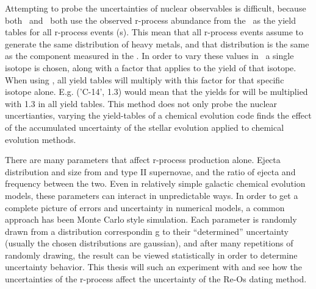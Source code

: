 
Attempting to probe the uncertainties of nuclear observables is difficult, because both \eris\ and \omegamodel\ both use the observed r-process abundance from the \sos\ as the yield tables for all r-process events (\nsm\-s). This mean that all r-process events assume to generate the same distribution of heavy metals, and that distribution is the same as the component measured in the \sos.
In order to vary these values in \omegamodel\ a single isotope is chosen, along with a factor that applies to the yield of that isotope. When using \omegamodel, all yield tables will multiply with this factor for that specific isotope alone. E.g. ('C-14', 1.3) would mean that the yields for  will be multiplied with 1.3 in all yield tables.
This method does not only probe the nuclear uncertianties, varying the yield-tables of a chemical evolution code finds the effect of the accumulated uncertainty of the stellar evolution applied to chemical evolution methods.

There are many parameters that affect r-process production alone. Ejecta distribution and size from \nsm and type II supernovae, and the ratio of ejecta and frequency between the two. Even in relatively simple galactic chemical evolution models, these parameters can interact in unpredictable ways. In order to get a complete picture of errors and uncertainty in numerical models, a common approach has been Monte Carlo style simulation. Each parameter is randomly drawn from a distribution correspondin g to their ``determined'' uncertainty (usually the chosen distributions are gaussian), and after many repetitions of randomly drawing, the result can be viewed statistically in order to determine uncertainty behavior.
This thesis will such an experiment with  and see how the uncertainties of the r-process affect the uncertainty of the Re-Os dating method.

\iffalse

\section{fitting}

\section{impact of stellar yields}


\fi
